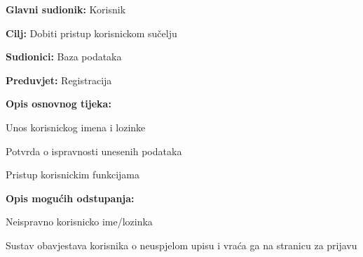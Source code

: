 					\noindent {}
					\begin{packed_item}

						\item \textbf{Glavni sudionik: } Korisnik
						\item  \textbf{Cilj:} Dobiti pristup korisnickom sučelju
						\item  \textbf{Sudionici:} Baza podataka
						\item  \textbf{Preduvjet:} Registracija
						\item  \textbf{Opis osnovnog tijeka:}

						\item[] \begin{packed_enum}

							\item Unos korisnickog imena i lozinke
							\item Potvrda o ispravnosti unesenih podataka
							\item Pristup korisnickim funkcijama

						\end{packed_enum}

						\item  \textbf{Opis mogućih odstupanja:}

						\item[] \begin{packed_item}

							\item[2.a] Neispravno korisnicko ime/lozinka 
							\item[] \begin{packed_enum}

								\item Sustav obavjestava korisnika o neuspjelom upisu i vraća ga na stranicu za prijavu


							\end{packed_enum}

						\end{packed_item}
					\end{packed_item}



